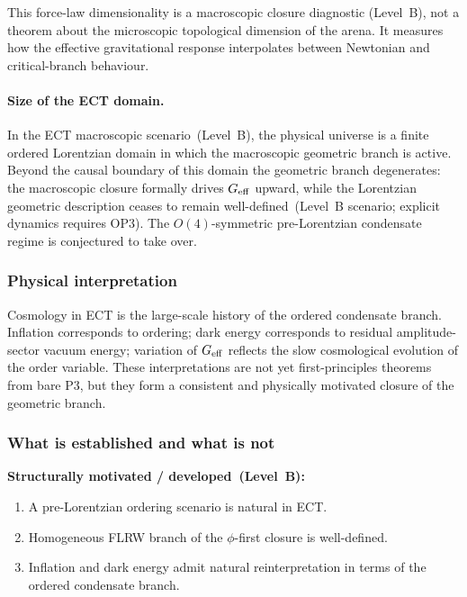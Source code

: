 \documentclass[11pt,a4paper]{article}
\numberwithin{equation}{section}
\begin{document}
This force-law dimensionality is a macroscopic closure diagnostic
(Level~B), not a theorem about the microscopic topological dimension
of the arena.  It measures how the effective gravitational response
interpolates between Newtonian and critical-branch behaviour.

\paragraph{Size of the ECT domain.}

In the ECT macroscopic scenario~(Level~B), the physical universe
is a finite ordered Lorentzian domain in which the macroscopic
geometric branch is active. Beyond the causal boundary of this domain
the geometric branch degenerates: the macroscopic closure formally
drives $G_{\rm eff}$ upward, while the Lorentzian geometric description
ceases to remain well-defined~(Level~B scenario;
explicit dynamics requires OP3). The $O(4)$-symmetric
pre-Lorentzian condensate regime is conjectured to take over.


\subsubsection*{Physical interpretation}

Cosmology in ECT is the large-scale history of the ordered condensate
branch.
Inflation corresponds to ordering; dark energy corresponds to residual
amplitude-sector vacuum energy; variation of $G_{\rm eff}$ reflects the slow
cosmological evolution of the order variable.
These interpretations are not yet first-principles theorems from bare
P3, but they form a consistent and physically motivated closure of the
geometric branch.

\subsubsection*{What is established and what is not}

\textbf{Structurally motivated / developed~(Level~B):}
\begin{enumerate}[label=(\roman*)]
  \item A pre-Lorentzian ordering scenario is natural in ECT.
  \item Homogeneous FLRW branch of the $\phi$-first closure is
    well-defined.
  \item Inflation and dark energy admit natural reinterpretation in
    terms of the ordered condensate branch.
\end{enumerate}
\end{document}
